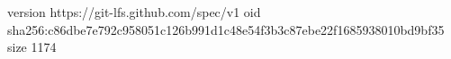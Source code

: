 version https://git-lfs.github.com/spec/v1
oid sha256:c86dbe7e792c958051c126b991d1c48e54f3b3c87ebe22f1685938010bd9bf35
size 1174
